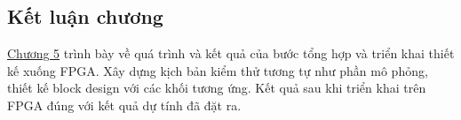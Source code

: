 \subsection{Kết luận chương}

\hyperref[chuong5]{Chương 5} trình bày về quá trình và kết quả của bước tổng hợp và triển khai thiết kế xuống FPGA. Xây dựng kịch bản kiểm thử tương tự như phần mô phỏng, thiết kế block design với các khối tương ứng. Kết quả sau khi triển khai trên FPGA đúng với kết quả dự tính đã đặt ra.
\newpage